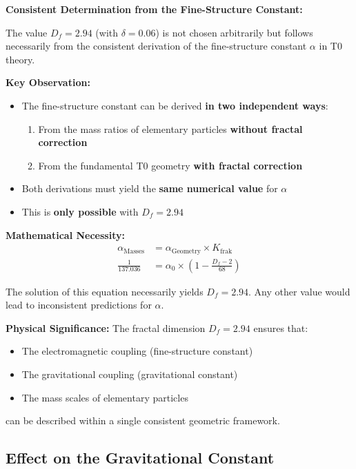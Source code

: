 \documentclass[12pt,a4paper]{article}
\begin{document}
	\begin{derivation}
		\textbf{Consistent Determination from the Fine-Structure Constant:}
		
		The value $D_f = 2.94$ (with $\delta = 0.06$) is not chosen arbitrarily but follows necessarily from the consistent derivation of the fine-structure constant $\alpha$ in T0 theory.
		
		\textbf{Key Observation:}
		\begin{itemize}
			\item The fine-structure constant can be derived \textbf{in two independent ways}:
			\begin{enumerate}
				\item From the mass ratios of elementary particles \textbf{without fractal correction}
				\item From the fundamental T0 geometry \textbf{with fractal correction}
			\end{enumerate}
			\item Both derivations must yield the \textbf{same numerical value} for $\alpha$
			\item This is \textbf{only possible} with $D_f = 2.94$
		\end{itemize}
		
		\textbf{Mathematical Necessity:}
		\begin{align}
			\alpha_{\text{Masses}} &= \alpha_{\text{Geometry}} \times K_{\text{frak}} \\
			\frac{1}{137.036} &= \alpha_0 \times \left(1 - \frac{D_f - 2}{68}\right)
		\end{align}
		
		The solution of this equation necessarily yields $D_f = 2.94$. Any other value would lead to inconsistent predictions for $\alpha$.
		
		\textbf{Physical Significance:}
		The fractal dimension $D_f = 2.94$ ensures that:
		\begin{itemize}
			\item The electromagnetic coupling (fine-structure constant)
			\item The gravitational coupling (gravitational constant)
			\item The mass scales of elementary particles
		\end{itemize}
		can be described within a single consistent geometric framework.
	\end{derivation}
	
	\subsection{Effect on the Gravitational Constant}
	
\end{document}
